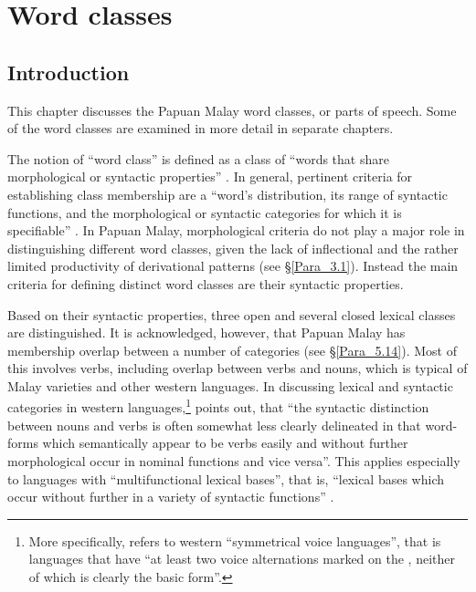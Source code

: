 \chapter[Word classes]{Word classes}\label{Para_5}
\section{Introduction}\label{Para_5.1}

This chapter discusses the Papuan Malay word classes, or parts of speech. Some of the word classes are examined in more detail in separate chapters.



The notion of “word class” is defined as a class of “words that share morphological or syntactic properties” {\citep[5188]{Asher.1994}}. In general, pertinent criteria for establishing class membership are a “word’s distribution, its range of syntactic functions, and the morphological or syntactic categories for which it is specifiable” \citep[1–2]{Schachter.2007}. In Papuan Malay, morphological criteria do not play a major role in distinguishing different word classes, given the lack of inflectional  and the rather limited productivity of derivational patterns (see §\ref{Para_3.1}). Instead the main criteria for defining distinct word classes are their syntactic properties.



Based on their syntactic properties, three open and several closed lexical classes are distinguished. It is acknowledged, however, that Papuan Malay has membership overlap between a number of categories (see §\ref{Para_5.14}). Most of this  involves verbs, including overlap between verbs and nouns, which is typical of Malay varieties and other western  languages. In discussing lexical and syntactic categories in western  languages,\footnote{More specifically, \citet[112]{Himmelmann.2005} refers to western  “symmetrical voice languages”, that is languages that have “at least two voice alternations marked on the , neither of which is clearly the basic form”.}
 \citet[127]{Himmelmann.2005} points out, that “the syntactic distinction between nouns and verbs is often somewhat less clearly delineated in that word-forms which semantically appear to be verbs easily and without further morphological  occur in nominal functions and vice versa”. This applies especially to languages with “multifunctional lexical bases'', that is, “lexical bases which occur without further  in a variety of syntactic functions” \citep[129]{Himmelmann.2005}.



